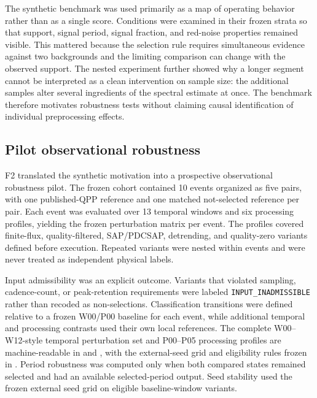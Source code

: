 \documentclass[11pt,a4paper]{article}
\begin{document}
The synthetic benchmark was used primarily as a map of operating behavior rather than as a single score. Conditions were examined in their frozen strata so that support, signal period, signal fraction, and red-noise properties remained visible. This mattered because the selection rule requires simultaneous evidence against two backgrounds and the limiting comparison can change with the observed support. The nested experiment further showed why a longer segment cannot be interpreted as a clean intervention on sample size: the additional samples alter several ingredients of the spectral estimate at once. The benchmark therefore motivates robustness tests without claiming causal identification of individual preprocessing effects.

\subsection{Pilot observational robustness}
F2 translated the synthetic motivation into a prospective observational robustness pilot. The frozen cohort contained 10 events organized as five pairs, with one published-QPP reference and one matched not-selected reference per pair. Each event was evaluated over 13 temporal windows and six processing profiles, yielding the frozen perturbation matrix per event. The profiles covered finite-flux, quality-filtered, SAP/PDCSAP, detrending, and quality-zero variants defined before execution. Repeated variants were nested within events and were never treated as independent physical labels.

Input admissibility was an explicit outcome. Variants that violated sampling, cadence-count, or peak-retention requirements were labeled \texttt{INPUT\_INADMISSIBLE} rather than recoded as non-selections. Classification transitions were defined relative to a frozen W00/P00 baseline for each event, while additional temporal and processing contrasts used their own local references. The complete W00--W12-style temporal perturbation set and P00--P05 processing profiles are machine-readable in  and , with the external-seed grid and eligibility rules frozen in . Period robustness was computed only when both compared states remained selected and had an available selected-period output. Seed stability used the frozen external seed grid on eligible baseline-window variants.
\end{document}
